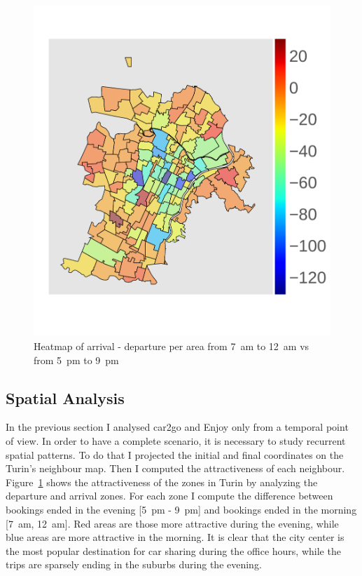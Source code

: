 \begin{figure}[t!]
\centering
\vspace{-10pt}
 \includegraphics[width=0.72\columnwidth]{figures/clorophlet_o_minus_o1.pdf}
 \vspace{-10pt}
 \caption{Heatmap of arrival - departure per area from 7~am to 12~am vs from 5~pm to 9~pm \label{fig:3_5_heatmap_arr_dep}}
\end{figure}


\subsection{Spatial Analysis}  


In the previous section I analysed car2go and Enjoy only from a temporal point of view. In order to have a complete scenario, it is necessary to study recurrent spatial patterns. To do that I projected the initial and final coordinates on the Turin's neighbour map. Then I computed the attractiveness of each neighbour. Figure~\ref{fig:3_5_heatmap_arr_dep} shows the attractiveness of the  zones in Turin by analyzing the departure and arrival zones. For each zone I compute the difference between bookings ended in the evening [5~pm - 9~pm] and bookings ended in the morning [7~am, 12~am]. Red {areas are those} more attractive during the evening, while blue areas are more attractive in the morning. It is clear that the city center is the most popular destination for car sharing during the office hours, while the trips are sparsely ending in the suburbs during the evening.


